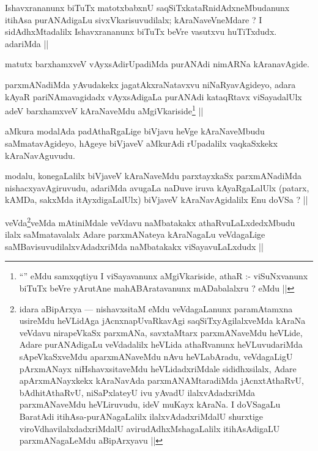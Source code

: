 \begin{artha}
Ishavxrananunx biTuTx matotxbabxnU saqSiTxkataRnidAdxneMbudanunx itihAsa purANAdigaLu sivxVkarisuvudilalx; kAraNaveVneMdare ? I sidAdhxMtadalilx Ishavxrananunx biTuTx beVre vasutxvu huTiTxdudx. adariMda ||
\end{artha}

\begin{artha}
matutx barxhamxveV vAyxsAdirUpadiMda purANAdi nimARNa kAranavAgide.
\end{artha}

\begin{artha}
parxmANadiMda yAvudakekx jagatAkxraNatavxvu niNaRyavAgideyo, adara kAyaR pariNAmavagidadx vAyxsAdigaLa purANAdi kataqRtavx viSayadalUlx adeV barxhamxveV kAraNaveMdu aMgiVkariside\footnote[1]{``'' eMdu samxqqtiyu I viSayavanunx aMgiVkariside, athaR :- viSuNxvanunx biTuTx beVre yArutAne mahABAratavanunx mADabalalxru ? eMdu ||} ||
\end{artha}


\begin{artha}
aMkura modalAda padAthaRgaLige biVjavu heVge kAraNaveMbudu saMmatavAgideyo, hAgeye biVjaveV aMkurAdi rUpadalilx vaqkaSxkekx kAraNavAguvudu.
\end{artha}

\begin{artha}
modalu, konegaLalilx biVjaveV kAraNaveMdu parxtayxkaSx parxmANadiMda nishacxyavAgiruvudu, adariMda avugaLa naDuve iruva kAyaRgaLalUlx (patarx, kAMDa, sakxMda itAyxdigaLalUlx) biVjaveV kAraNavAgidalilx Enu doVSa ? ||
\end{artha}


\begin{artha}
veVda\footnote[1]{idara aBipArxya --- nishavxsitaM eMdu veVdagaLanunx paramAtamxna usireMdu heVLidAga jAcnxnapUvaRkavAgi saqSiTxyAgilalxveMda kAraNa veVdavu nirapeVkaSx parxmANa, savxtaMtarx parxmANaveMdu heVLide, Adare purANAdigaLu veVdadalilx heVLida athaRvanunx heVLuvudariMda sApeVkaSxveMdu aparxmANaveMdu nAvu heVLabAradu, veVdagaLigU pArxmANayx niHshavxsitaveMdu heVLidadxriMdale sididhxsilalx, Adare apArxmANayxkekx kAraNavAda parxmANAMtaradiMda jAcnxtAthaRvU, bAdhitAthaRvU, niSaPxlateyU ivu yAvadU ilalxvAdadxriMda parxmANaveMdu heVLiruvudu, ideV muKayx kAraNa. I doVSagaLu BaratAdi itihAsa-purANagaLalilx ilalxvAdadxriMdalU shurxtige viroVdhavilalxdadxriMdalU avirudAdhxMshagaLalilx itihAsAdigaLU parxmANagaLeMdu aBipArxyavu ||}veMda mAtiniMdale veVdavu naMbatakakx athaRvuLaLxdedxMbudu ilalx saMmatavalalx Adare parxmANateya kAraNagaLu veVdagaLige saMBavisuvudilalxvAdadxriMda naMbatakakx viSayavuLaLxdudx ||
\end{artha}

